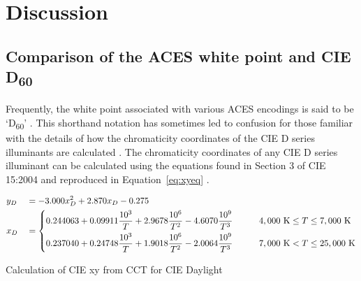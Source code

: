 \regularsectionformat
\chapter{Discussion}
\label{chap:discussion}

\section{Comparison of the ACES white point and CIE \texorpdfstring{D\textsubscript{60}}{D60}}
\label{sec:comp}
Frequently, the white point associated with various ACES encodings is said to be `D\textsubscript{60}' \cite{autodesk,bmforum,acescentralD60}. This shorthand notation has sometimes led to confusion for those familiar with the details of how the chromaticity coordinates of the CIE D series illuminants are calculated \cite{notD60}.  The chromaticity coordinates of any CIE D series illuminant can be calculated using the equations found in Section 3 of CIE 15:2004 and reproduced in Equation~\ref{eq:xyeq} \cite{CIE152004}.

\begin{floatequ}[!ht]
    \begin{alignat*}{2}
    & y_{D} && = -3.000x_{D}^{2}+2.870x_{D}-0.275 \\
    & x_{D} && =
        \begin{dcases}
            0.244063+0.09911{\frac {10^{3}}{T}}+2.9678{\frac {10^{6}}{T^{2}}}-4.6070{\frac {10^{9}}{T^{3}}} \qquad & 4,000\ \mathrm {K} \leq T\leq 7,000\ \mathrm {K} \\
            0.237040+0.24748{\frac {10^{3}}{T}}+1.9018{\frac {10^{6}}{T^{2}}}-2.0064{\frac {10^{9}}{T^{3}}} \qquad & 7,000\ \mathrm {K} < T\leq 25,000\ \mathrm {K}
        \end{dcases}
    \end{alignat*}
    
    \captionsetup{width=.75\textwidth}
    \caption{Calculation of CIE xy from CCT for CIE Daylight}
    \label{eq:xyeq}
\end{floatequ}

